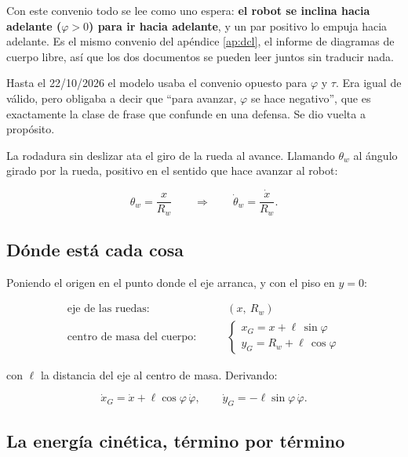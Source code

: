 \documentclass[11pt,a4paper]{report}
\begin{document}
\begin{idea}
Con este convenio todo se lee como uno espera: \textbf{el robot se inclina hacia adelante
(}$\varphi > 0$\textbf{) para ir hacia adelante}, y un par positivo lo empuja hacia adelante.
Es el mismo convenio del apéndice \ref{ap:dcl}, el informe de diagramas de cuerpo libre, así
que los dos documentos se pueden leer juntos sin traducir nada.

Hasta el 22/10/2026 el modelo usaba el convenio opuesto para $\varphi$ y $\tau$. Era
igual de válido, pero obligaba a decir que ``para avanzar, $\varphi$ se hace negativo'', que
es exactamente la clase de frase que confunde en una defensa. Se dio vuelta a propósito.
\end{idea}

La rodadura sin deslizar ata el giro de la rueda al avance. Llamando $\theta_w$ al ángulo
girado por la rueda, positivo en el sentido que hace avanzar al robot:

\begin{equation}\label{eq:rodadura}
\theta_w = \frac{x}{R_w}
\qquad\Longrightarrow\qquad
\dot\theta_w = \frac{\dot x}{R_w}.
\end{equation}

\subsection{Dónde está cada cosa}

Poniendo el origen en el punto donde el eje arranca, y con el piso en $y = 0$:

\begin{align}
\text{eje de las ruedas:}&\qquad (x,\ R_w) \\
\text{centro de masa del cuerpo:}&\qquad
\begin{cases}
x_G = x + \ell\,\sin\varphi \\
y_G = R_w + \ell\,\cos\varphi
\end{cases}
\end{align}

con $\ell$ la distancia del eje al centro de masa. Derivando:

\begin{equation}
\dot x_G = \dot x + \ell\cos\varphi\,\dot\varphi,
\qquad
\dot y_G = -\ell\sin\varphi\,\dot\varphi .
\end{equation}

\subsection{La energía cinética, término por término}
\end{document}
